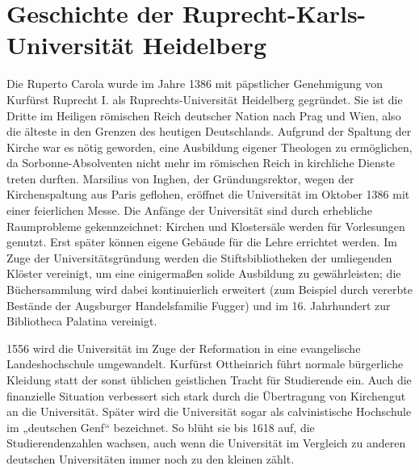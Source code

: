 \section{Geschichte der Ruprecht-Karls-Universität Heidelberg}
\label{geschichte}
Die Ruperto Carola wurde im Jahre 1386 mit päpstlicher Genehmigung von Kurfürst Ruprecht I. als Ruprechts-Universität Heidelberg gegründet. Sie ist die Dritte im Heiligen römischen Reich deutscher Nation nach Prag und Wien, also die älteste in den Grenzen des heutigen Deutschlands. Aufgrund der Spaltung der Kirche war es nötig geworden, eine Ausbildung eigener Theologen zu ermöglichen, da Sorbonne-Absolventen nicht mehr im römischen Reich in kirchliche Dienste treten durften. Marsilius von Inghen, der Gründungsrektor, wegen der Kirchenspaltung aus Paris geflohen, eröffnet die Universität im Oktober 1386 mit einer feierlichen Messe. Die Anfänge der Universität sind durch erhebliche Raumprobleme gekennzeichnet: Kirchen und Klostersäle werden für Vorlesungen genutzt. Erst später können eigene Gebäude für die Lehre errichtet werden. Im Zuge der Universitätsgründung werden die Stiftsbibliotheken der umliegenden Klöster vereinigt, um eine einigermaßen solide Ausbildung zu gewährleisten; die Büchersammlung wird dabei kontinuierlich erweitert (zum Beispiel durch vererbte Bestände der Augsburger Handelsfamilie Fugger) und im 16. Jahrhundert zur Bibliotheca Palatina vereinigt.

1556 wird die Universität im Zuge der Reformation in eine evangelische Landeshochschule umgewandelt. Kurfürst Ottheinrich führt normale bürgerliche Kleidung statt der sonst üblichen geistlichen Tracht für Studierende ein. Auch die finanzielle Situation verbessert sich stark durch die Übertragung von Kirchengut an die Universität. Später wird die Universität sogar als calvinistische Hochschule im „deutschen Genf“ bezeichnet. So blüht sie bis 1618 auf, die Studierendenzahlen wachsen, auch wenn die Universität im Vergleich zu anderen deutschen Universitäten immer noch zu den kleinen zählt.


